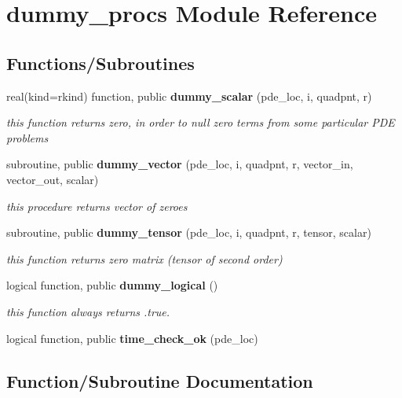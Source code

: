 \section{dummy\+\_\+procs Module Reference}
\label{namespacedummy__procs}
\subsection*{Functions/\+Subroutines}
\begin{DoxyCompactItemize}
\item 
real(kind=rkind) function, public {\bf dummy\+\_\+scalar} (pde\+\_\+loc, i, quadpnt, r)
\begin{DoxyCompactList}\small\item\em this function returns zero, in order to null zero terms from some particular P\+DE problems \end{DoxyCompactList}\item 
subroutine, public {\bf dummy\+\_\+vector} (pde\+\_\+loc, i, quadpnt, r, vector\+\_\+in, vector\+\_\+out, scalar)
\begin{DoxyCompactList}\small\item\em this procedure returns vector of zeroes \end{DoxyCompactList}\item 
subroutine, public {\bf dummy\+\_\+tensor} (pde\+\_\+loc, i, quadpnt, r, tensor, scalar)
\begin{DoxyCompactList}\small\item\em this function returns zero matrix (tensor of second order) \end{DoxyCompactList}\item 
logical function, public {\bf dummy\+\_\+logical} ()
\begin{DoxyCompactList}\small\item\em this function always returns .true. \end{DoxyCompactList}\item 
logical function, public {\bf time\+\_\+check\+\_\+ok} (pde\+\_\+loc)
\end{DoxyCompactItemize}


\subsection{Function/\+Subroutine Documentation}
